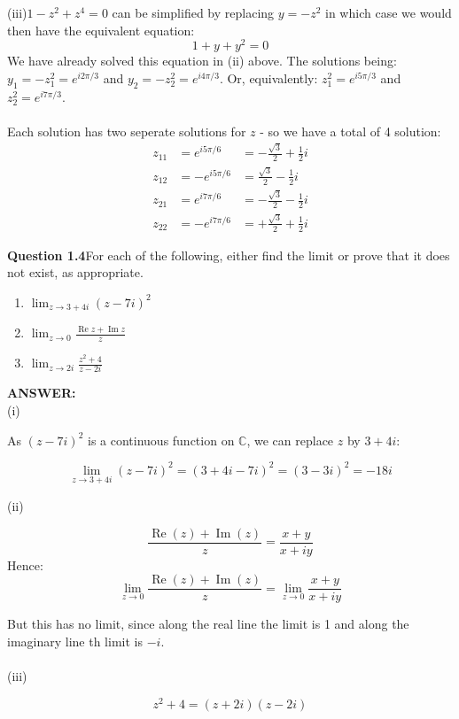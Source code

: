 \documentclass[12pt,a4paper]{article}
\newcommand{\answer}{\vspace{3\baselineskip}\textbf{ANSWER:}}
\newcommand{\question}[2]{\textbf{Question #1}\quad #2}
\begin{document}
(iii)\quad $1 - z^2 + z^4 = 0$ can be simplified by replacing $y=-z^2$ in which case we 
would then have the equivalent equation:
\[
1 + y + y^2 = 0 \tag{C}
\]
We have already solved this equation in (ii) above.  The solutions being: $y_1 = -z_1^2 =e^{i2\pi/3}$
and $y_2 = -z_2^2 =e^{i4\pi/3}$. Or, equivalently: $z_1^2 = e^{i5\pi/3}$ and 
$z_2^2 =e^{i7\pi/3}$.\\
\\
Each solution has two seperate solutions for $z$ - so we have a total of 4 solution:
\[
\begin{aligned}
z_{11} &= e^{i5\pi/6} &= -\frac{\sqrt3}{2} + \frac{1}{2}i \\
z_{12} &= -e^{i5\pi/6} &= \frac{\sqrt3}{2} - \frac{1}{2}i  \\
z_{21} &= e^{i7\pi/6} &= -\frac{\sqrt3}{2} - \frac{1}{2}i \\
z_{22} &= -e^{i7\pi/6} &= +\frac{\sqrt3}{2} + \frac{1}{2}i
\end{aligned}
\]

\newpage

\question{1.4}{For each of the following, either find the limit or prove that it does not exist, as appropriate.

\begin{enumerate}
\item[(i)] $\displaystyle \lim_{z\to 3+4i}(z-7i)^2$
\item[(ii)] $\displaystyle \lim_{z\to 0}\frac{\operatorname{Re}z+\operatorname{Im}z}{z}$
\item[(iii)] $\displaystyle \lim_{z\to 2i}\frac{z^2+4}{z-2i}$
\end{enumerate}
}

\answer\\
(i)

As $(z-7i)^2$ is a continuous function on $\mathbb{C}$, we can replace $z$ by $3+4i$:

\[
\lim_{z\to 3+4i}(z-7i)^2
=
(3+4i-7i)^2
=
(3-3i)^2
=
-18i
\]

(ii)

\[
\frac{\operatorname{Re}(z)+\operatorname{Im}(z)}{z}
=
\frac{x + y}{x + iy}
\]
Hence:
\[
\lim_{z\to 0} \frac{\operatorname{Re}(z)+\operatorname{Im}(z)}{z}
=
\lim_{z\to 0} \frac{x + y}{x + iy}
\]

But this has no limit, since along the real line the limit is 1 and along the imaginary line th limit is $-i$.\\
\\
(iii)

\[
z^2+4=(z+2i)(z-2i)
\]
\end{document}

